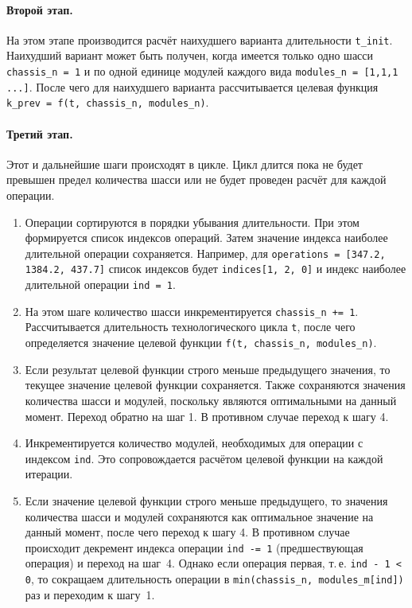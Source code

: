 \paragraph{Второй этап.} На этом этапе производится расчёт наихудшего варианта длительности \texttt{t\_init}.
Наихудший вариант может быть получен, когда имеется только одно шасси \texttt{chassis\_n = 1} и по одной единице модулей каждого вида \texttt{modules\_n = [1,1,1 ...]}. После чего для наихудшего варианта рассчитывается целевая функция \texttt{k\_prev = f(t, chassis\_n, modules\_n)}.

\paragraph{Третий этап.} Этот и дальнейшие шаги происходят в цикле. Цикл длится пока не будет превышен предел количества шасси или не будет проведен расчёт для каждой операции.

\begin{enumerate}
	\item Операции сортируются в порядки убывания длительности. При этом формируется список индексов операций. Затем значение индекса наиболее длительной операции сохраняется. Например, для \texttt{operations = [347.2, 1384.2, 437.7]} список индексов будет \texttt{indices[1, 2, 0]} и индекс наиболее длительной операции \texttt{ind = 1}.
	\item На этом шаге количество шасси инкрементируется  \texttt{chassis\_n += 1}. Рассчитывается длительность технологического  цикла \texttt{t}, после чего определяется значение  целевой функции \texttt{f(t, chassis\_n, modules\_n)}.
	\item Если результат целевой функции строго меньше предыдущего значения, то  текущее значение целевой функции сохраняется. Также сохраняются значения количества шасси и модулей, поскольку являются  оптимальными на данный момент. Переход обратно на шаг 1. В противном случае переход к шагу 4.
	\item Инкрементируется количество модулей, необходимых для операции с индексом \texttt{ind}. Это сопровождается расчётом целевой функции на каждой итерации. 
	\item Если значение целевой функции строго меньше предыдущего, то значения количества шасси и модулей сохраняются как оптимальное значение на данный момент, после чего переход к шагу 4. В противном случае происходит декремент индекса операции \mbox{\texttt{ind -= 1}} (предшествующая операция) и переход на шаг~4. Однако если операция первая, т.\,е. \texttt{ind - 1 < 0}, то сокращаем длительность операции в \texttt{min(chassis\_n, modules\_m[ind])} раз и переходим к шагу~1.
\end{enumerate}

